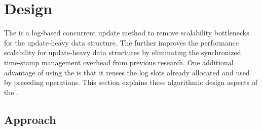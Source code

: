 \section{Design}
\label{sec:ldu}


The \LDU is a log-based concurrent update method to remove scalability
bottlenecks for the update-heavy data structure.
The \LDU further improves the performance scalability for update-heavy data structures
by eliminating the synchronized time-stamp management overhead from previous
research. One additional advantage of using the \LDU is that it reuses the log
slots already allocated and used by preceding operations.
This section explains these algorithmic design aspects of the \LDU.

\subsection{Approach}


